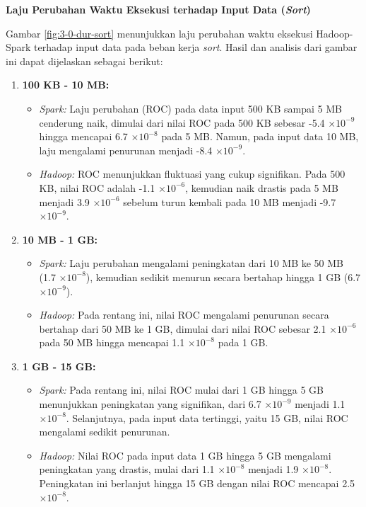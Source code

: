 \textbf{Laju Perubahan Waktu Eksekusi terhadap Input Data (\textit{Sort})}

Gambar \ref{fig:3-0-dur-sort} menunjukkan laju perubahan waktu eksekusi Hadoop-Spark terhadap input data pada beban kerja \textit{sort}. Hasil dan analisis dari gambar ini dapat dijelaskan sebagai berikut:
\begin{enumerate}
\item \textbf{100 KB - 10 MB:}
\begin{itemize}
\item \textit{Spark:} Laju perubahan (ROC) pada data input 500 KB sampai 5 MB cenderung naik, dimulai dari nilai ROC pada 500 KB sebesar -5.4 $\times 10^{-9}$ hingga mencapai 6.7 $\times 10^{-8}$ pada 5 MB. Namun, pada input data 10 MB, laju mengalami penurunan menjadi -8.4 $\times 10^{-9}$.
\item \textit{Hadoop:} ROC menunjukkan fluktuasi yang cukup signifikan. Pada 500 KB, nilai ROC adalah -1.1 $\times 10^{-6}$, kemudian naik drastis pada 5 MB menjadi 3.9 $\times 10^{-6}$ sebelum turun kembali pada 10 MB menjadi -9.7 $\times 10^{-9}$.
\end{itemize}
\item \textbf{10 MB - 1 GB:}
\begin{itemize}
    \item \textit{Spark:} Laju perubahan mengalami peningkatan dari 10 MB ke 50 MB (1.7 $\times 10^{-8}$), kemudian sedikit menurun secara bertahap hingga 1 GB (6.7 $\times 10^{-9}$).
    \item \textit{Hadoop:} Pada rentang ini, nilai ROC mengalami penurunan secara bertahap dari 50 MB ke 1 GB, dimulai dari nilai ROC sebesar 2.1 $\times 10^{-6}$ pada 50 MB hingga mencapai 1.1 $\times 10^{-8}$ pada 1 GB.
\end{itemize}
\item \textbf{1 GB - 15 GB:}
\begin{itemize}
    \item \textit{Spark:} Pada rentang ini, nilai ROC mulai dari 1 GB hingga 5 GB menunjukkan peningkatan yang signifikan, dari 6.7 $\times 10^{-9}$ menjadi 1.1 $\times 10^{-8}$. Selanjutnya, pada input data tertinggi, yaitu 15 GB, nilai ROC mengalami sedikit penurunan.
    \item \textit{Hadoop:} Nilai ROC pada input data 1 GB hingga 5 GB mengalami peningkatan yang drastis, mulai dari 1.1 $\times 10^{-8}$ menjadi 1.9 $\times 10^{-8}$. Peningkatan ini berlanjut hingga 15 GB dengan nilai ROC mencapai 2.5 $\times 10^{-8}$.
\end{itemize}
\end{enumerate}

